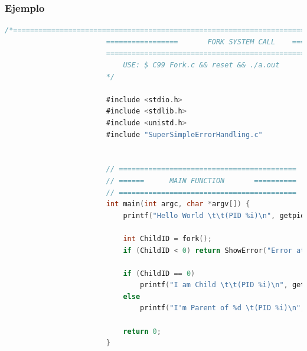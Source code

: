 \documentclass[12pt, fleqn]{report}                             %
\begin{document}
                \subsubsection{Ejemplo}
                    \begin{lstlisting}[language=C, gobble=24]
                        /*=======================================================================
                        =================       FORK SYSTEM CALL    =============================
                        =========================================================================
                            USE: $ C99 Fork.c && reset && ./a.out
                        */

                        #include <stdio.h>                                                  //We will need this
                        #include <stdlib.h>                                                 //We will need this        
                        #include <unistd.h>                                                 //We will need this        
                        #include "SuperSimpleErrorHandling.c"                               //My simple code :p


                        // ==========================================
                        // ======      MAIN FUNCTION       ==========
                        // ==========================================
                        int main(int argc, char *argv[]) {                                  //This is fucking main
                            printf("Hello World \t\t(PID %i)\n", getpid());                 //Show me your ID
                            
                            int ChildID = fork();                                           //Now create a new process
                            if (ChildID < 0) return ShowError("Error at Fork", 1);          //Go an show it

                            if (ChildID == 0)                                               //YOU ARE THE CHILD?
                                printf("I am Child \t\t(PID %i)\n", getpid());              //Show me your ID then kid
                            else                                                            //YOU ARE THE PARENT
                                printf("I'm Parent of %d \t(PID %i)\n", ChildID, getpid()); //Show me your ID then old man

                            return 0;
                        }
                    \end{lstlisting}
\end{document}
